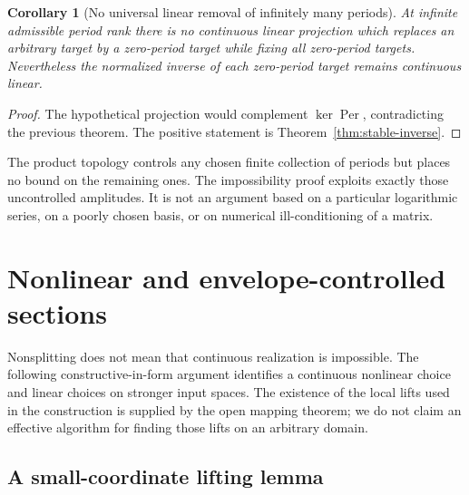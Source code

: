 \documentclass[11pt,a4paper]{article}
\numberwithin{equation}{section}
\newtheorem{corollary}[theorem]{Corollary}
\theoremstyle{definition}
\theoremstyle{remark}
\newcommand{\Per}{\operatorname{Per}}
\begin{document}
\begin{corollary}[No universal linear removal of infinitely many periods]
\label{cor:no-removal}
At infinite admissible period rank there is no continuous linear projection
which replaces an arbitrary target by a zero-period target while fixing all
zero-period targets. Nevertheless the normalized inverse of each zero-period
target remains continuous linear.
\end{corollary}
\begin{proof}
The hypothetical projection would complement $\ker\Per$, contradicting the
previous theorem. The positive statement is Theorem~\ref{thm:stable-inverse}.
\end{proof}

The product topology controls any chosen finite collection of periods but
places no bound on the remaining ones. The impossibility proof exploits
exactly those uncontrolled amplitudes. It is not an argument based on a
particular logarithmic series, on a poorly chosen basis, or on numerical
ill-conditioning of a matrix.

\section{Nonlinear and envelope-controlled sections}
\label{sec:selection}

Nonsplitting does not mean that continuous realization is impossible. The
following constructive-in-form argument identifies a continuous nonlinear
choice and linear choices on stronger input spaces. The existence of the
local lifts used in the construction is supplied by the open mapping theorem;
we do not claim an effective algorithm for finding those lifts on an arbitrary
domain.

\subsection{A small-coordinate lifting lemma}
\end{document}
